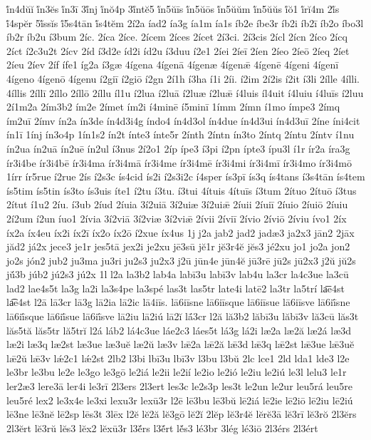 {ĭ́n4dŭĭ
ĭ́n3ĕs
ĭ́n3ī
3ĭ́nj
ĭ́nŏ4p
3ĭ́ntĕ5
ĭ́n5ŭīs
ĭ́n5ŭōs
ĭ́n5ŭŭm
ĭ́n5ŭŭs
ĭ́ŏ1
ĭ́rĭ4m
2ĭ́s
ĭ́4spĕr
5ĭ́ssĭs
ĭ́5s4tān
ĭ́s4tĕm
2í2a
íad2
ía3g
ía1m
ía1s
íb2e
íbe3r
íb2i
íb2ī
íb2o
íbo3l
íb2r
íb2u
í3bum
2íc.
2íca
2íce.
2ícem
2íces
2ícet
2í3ci.
2í3cis
2ícl
2ícn
2íco
2ícq
2íct
í2c3u2t
2ícv
2íd
í3d2e
íd2i
íd2u
í3duu
í2e1
2íei
2íeī
2íen
2íeo
2íeō
2íeq
2íet
2íeu
2íev
2íf
ífe1
íg2a
í3gæ
4ígena
4ígenā
4ígenæ
4ígenǣ
4ígenē
4ígeni
4ígenī
4ígeno
4ígenō
4ígenu
í2giī
í2giō
í2gn
2í1h
í3ha
í1i
2íi.
í2im
2í2is
í2it
í3li
2ílle
4ílli.
4íllis
2íllī
2íllo
2íllō
2íllu
íl1u
í2lua
í2luā
í2luæ
í2luǣ
í4luis
íl4uit
í4luiu
í4luīs
í2luu
2í1m2a
2ím3b2
ím2e
2ímet
ím2i
í4minē
í5minī
1ímm
2ímn
í1mo
ímpe3
2ímq
ím2uī
2ímv
ín2a
ín3de
ín4d3i4g
índo4
ín4d3ol
ín4due
ín4d3ui
ín4d3uī
2íne
íni4cit
ín1ī
1ínj
ín3o4p
1ín1s2
ín2t
ínte3
ínte5r
2ínth
2íntn
ín3to
2íntq
2íntu
2íntv
í1nu
ín2ua
ín2uā
ín2uē
ín2ul
í3nus
2í2o1
2íp
ípe3
í3pi
í2pn
ípte3
ípu3l
í1r
ír2a
íra3g
ír3i4be
ír3i4bē
ír3i4ma
ír3i4mā
ír3i4me
ír3i4mē
ír3i4mi
ír3i4mī
ír3i4mo
ír3i4mō
1írr
ír5rue
í2rue
2ís
í2s3c
ís4cid
ís2i
í2s3i2c
í4sper
ís3pī
ís3q
ís4tans
í3s4tān
ís4tem
ís5tim
ís5tin
ís3to
ís3uis
íte1
í2tu
í3tu.
í3tui
4ítuis
4ítuīs
í3tum
2ítuo
2ítuō
í3tus
2ítut
í1u2
2íu.
í3ub
2íud
2íuia
3í2uiā
3í2uiæ
3í2uiǣ
2íuii
2íuiī
2íuio
2íuiō
2íuiu
2í2um
í2un
íuo1
2ívia
3í2viā
3í2viæ
3í2viǣ
2ívii
2íviī
2ívio
2íviō
2íviu
ívo1
2íx
íx2a
íx4eu
íx2i
íx2ī
íx2o
íx2ō
í2xue
íx4us
1j
j2a
jab2
jad2
jadæ3
ja2x3
jān2
2jāx
jăd2
já2x
jece3
je1r
jes5tā
jex2i
je2xu
jē3sū
jĕ1r
jĕ3r4ĕ
jĕs3
jé2xu
jo1
jo2a
jon2
jo2s
jón2
jub2
ju3ma
ju3ri
ju2s3
ju2x3
j2ū
jūn4e
jūn4ĕ
jū3rē
jū2s
jū2x3
j2ŭ
jŭ2s
jŭ́3b
júb2
jú2s3
jú2x
1l
l2a
la3b2
lab4a
labī3u
labī3v
lab4u
la3cr
la4c3ue
la3cū
lad2
lae4s5t
la3g
la2i
la3s4pe
la3spé
las3t
las5tr
late4i
latē2
la3tr
la5trí
la͞e4st
la͡e4st
l2ā
lā3cr
lā3g
lā2ia
lā2ic
lā4iīs.
lā6iīsne
lā6iīsque
lā6iīsue
lā6iīsve
lā6iī́sne
lā6iī́sque
lā6iī́sue
lā6iī́sve
lā2iu
lā2iú
lā2ĭ
lā́3cr
l2ă
lă3b2
lăbī3u
lăbī3v
lă3cū
lăs3t
lăs5tă
lăs5tr
lă5trĭ
l2á
láb2
lá4c3ue
láe2c3
láes5t
lá3g
lá2i
læ2a
læ2ă
læ2á
læ3d
læ2i
læ3q
læ2st
læ3ue
læ3uĕ
læ2ŭ
læ3v
lǣ2a
lǣ2ă
lǣ3d
lǣ3q
lǣ2st
lǣ3ue
lǣ3uĕ
lǣ2ŭ
lǣ3v
lǽ2c1
lǽ2st
2lb2
l3bi
lbī3u
lbī3v
l3bu
l3bŭ
2lc
lce1
2ld
lda1
lde3
l2e
le3br
le3bu
le2e
le3go
le3gō
le2iá
le2ii
le2ií
le2io
le2ió
le2iu
le2iú
le3l
lelu3
le1r
ler2æ3
lere3ā
ler4i
le3rī
2l3ers
2l3ert
les3c
le2s3p
les3t
le2un
le2ur
leu5rá
leu5re
leu5ré
lex2
le3x4e
le3xi
lexu3r
lexū3r
l2ē
lē3bu
lē3bŭ
lē2iá
lē2ie
lē2iō
lē2iu
lē2iú
lē3ne
lē3nĕ
lē2sp
lēs3t
3lēx
l2ĕ
lĕ2ă
lĕ3gō
lĕ2ĭ
2lĕp
lĕ3r4ĕ
lĕrĕ3ā
lĕ3rī
lĕ3rŏ
2l3ĕrs
2l3ĕrt
lĕ3rŭ
lĕs3
lĕx2
lĕxū3r
l3ĕ́rs
l3ĕ́rt
lĕ́s3
lé3br
3lég
lé3iō
2l3érs
2l3ért
}
